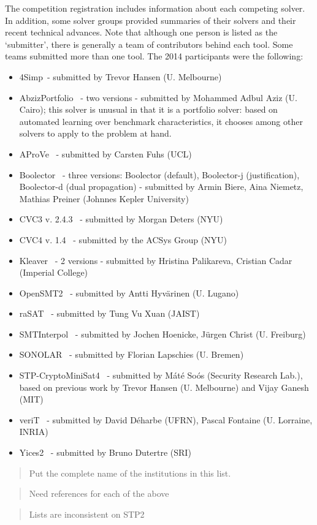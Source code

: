 \documentclass[twosize,11pt]{article}
\newcommand{\comment}[2]{\begin{quote}\sc #1\marginpar{\textcolor{red}{$\ast^{\mbox{#2}}$}}\end{quote}}
\newcommand{\davidd}[1]{\comment{#1}{DD}}
\newcommand{\davidc}[1]{\comment{#1}{DC}}
\begin{document}
The competition registration includes information about each competing solver. In addition, some solver groups provided summaries of their solvers and their recent technical advances.
 Note that although one person is listed as the `submitter', there is generally a team of contributors behind each tool. Some teams submitted more than one tool. The 2014 participants were the following:
\begin{itemize}
\item 4Simp~\cite{TBD}- submitted by Trevor Hansen (U. Melbourne)
\item AbzizPortfolio~\cite{TBD} - two versions - submitted by Mohammed Adbul Aziz (U. Cairo); this solver is unusual in that it is a portfolio solver: based on automated learning over benchmark characteristics, it chooses among other solvers to apply to the problem at hand.
\item AProVe~\cite{AProVE2014} - submitted by Carsten Fuhs (UCL)
\item Boolector~\cite{Boolector2015} - three versions: Boolector (default), Boolector-j (justification), Boolector-d (dual propagation) - submitted by Armin Biere, Aina Niemetz, Mathias Preiner (Johnnes Kepler University)
\item CVC3 v. 2.4.3~\cite{BT07} - submitted by Morgan Deters (NYU)
\item CVC4 v. 1.4~\cite{BCD+11} - submitted by the ACSys Group (NYU)
\item Kleaver~\cite{TBD} - 2 versions - submitted by Hristina Palikareva, Cristian Cadar (Imperial College)
\item OpenSMT2~\cite{TBD} - submitted by Antti Hyv\"arinen (U. Lugano)
\item raSAT~\cite{TBD} - submitted by Tung Vu Xuan (JAIST)
\item SMTInterpol~\cite{DBLP:conf/spin/ChristHN12,DBLP:conf/spin/2012} - submitted by Jochen Hoenicke, J\"urgen Christ (U. Freiburg)
\item SONOLAR~\cite{Peleska:2011:ATC:1986308.1986333} - submitted by Florian Lapschies (U. Bremen)
\item STP-CryptoMiniSat4~\cite{DBLP:conf/cav/GaneshD07,DBLP:conf/cav/2007} - submitted by M\'at\'e So\'os (Security Research Lab.), based on previous work by Trevor Hansen (U. Melbourne) and Vijay Ganesh (MIT)
\item veriT~\cite{veriT} - submitted by David D\'{e}harbe (UFRN), Pascal Fontaine (U. Lorraine, INRIA)
\item Yices2~\cite{Dutertre:cav2014} - submitted by Bruno Dutertre (SRI)
\end{itemize}
\davidd{Put the complete name of the institutions in this list.}
\davidc{Need references for each of the above}
\davidc{Lists are inconsistent on STP2}
\end{document}
